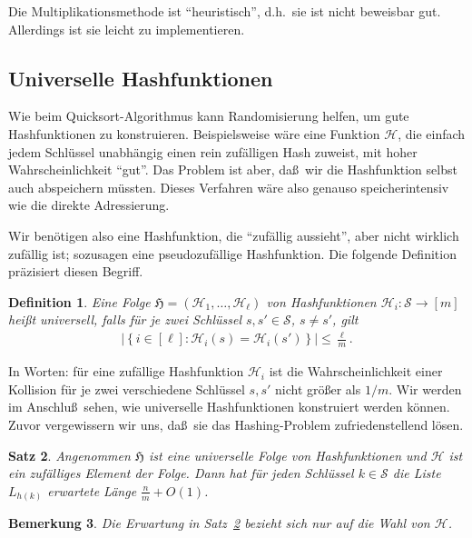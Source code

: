 \documentclass[10pt,reqno]{amsart}
\numberwithin{equation}{section}
\newcommand\cH{\mathcal H}
\newcommand\cS{\mathcal S}
\newcommand\fH{\mathfrak H}
\newtheorem{definition}{Definition}[section]
\newtheorem{remark}[definition]{Bemerkung}
\newtheorem{theorem}[definition]{Satz}
\newcommand\cbc[1]{\left\{{#1}\right\}}
\newcommand\abs[1]{\left|{#1}\right|}
\newcommand\Thm{Satz}
\begin{document}
Die Multiplikationsmethode ist ``heuristisch'', d.h.\ sie ist nicht beweisbar gut.
Allerdings ist sie leicht zu implementieren.

\subsection{Universelle Hashfunktionen}\label{sec_universal}
Wie beim Quicksort-Algorithmus kann Randomisierung helfen, um gute Hashfunktionen zu konstruieren.
Beispielsweise w\"are eine Funktion $\cH$, die einfach jedem Schl\"ussel unabh\"angig einen rein zuf\"alligen Hash zuweist, mit hoher Wahrscheinlichkeit ``gut''.
Das Problem ist aber, da\ss\ wir die Hashfunktion selbst auch abspeichern m\"ussten.
Dieses Verfahren w\"are also genauso speicherintensiv wie die direkte Adressierung.

Wir ben\"otigen also eine Hashfunktion, die ``zuf\"allig aussieht'', aber nicht wirklich zuf\"allig ist; sozusagen eine pseudozuf\"allige Hashfunktion.
Die folgende Definition pr\"azisiert diesen Begriff.

\begin{definition}\label{def_hash}
	Eine Folge $\fH=(\cH_1,\ldots,\cH_\ell)$ von Hashfunktionen $\cH_i:\cS\to[m]$ hei\ss t {\em universell}, falls f\"ur je zwei Schl\"ussel $s,s'\in\cS$, $s\neq s'$, gilt
	\begin{align}\label{eqdef_hash}
		\abs{\cbc{i\in[\ell]:\cH_i(s)=\cH_i(s')}}\leq\frac\ell m.
	\end{align}
\end{definition}

In Worten: f\"ur eine zuf\"allige Hashfunktion $\cH_i$ ist die Wahrscheinlichkeit einer Kollision f\"ur je zwei verschiedene Schl\"ussel $s,s'$ nicht gr\"o\ss er als $1/m$.
Wir werden im Anschlu\ss\ sehen, wie universelle Hashfunktionen konstruiert werden k\"onnen.
Zuvor vergewissern wir uns, da\ss\ sie das Hashing-Problem zufriedenstellend l\"osen.

\begin{theorem}\label{thm_hash}
	Angenommen $\fH$ ist eine universelle Folge von Hashfunktionen und $\cH$ ist ein zuf\"alliges Element der Folge.
	Dann hat f\"ur jeden Schl\"ussel $k\in\cS$ die Liste $L_{h(k)}$ erwartete L\"ange $\frac nm+O(1)$.
\end{theorem}

\begin{remark}\label{rem_hash}
	Die Erwartung in \Thm~\ref{thm_hash} bezieht sich nur auf die Wahl von $\cH$.
\end{remark}
\end{document}
